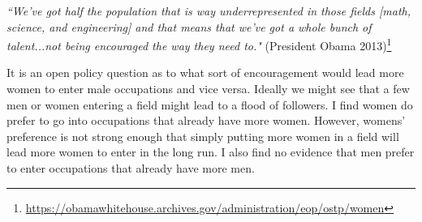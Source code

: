 \documentclass[12pt]{article}
\begin{document}







\textit{``We've got half the population that is way underrepresented in those fields [math, science, and engineering] and that means that we've got a whole bunch of talent...not being encouraged the way they need to."} (President Obama 2013)\footnote{\url{https://obamawhitehouse.archives.gov/administration/eop/ostp/women}}






It is an open policy question as to what sort of encouragement would lead more women to enter male occupations and vice versa. Ideally we might see that a few men or women entering a field might lead to a flood of followers. I find women do prefer to go into occupations that already have more women. However, womens' preference is not strong enough that simply putting more women in a field will lead more women to enter in the long run. I also find no evidence that men prefer to enter occupations that already have more men. 
\end{document}
